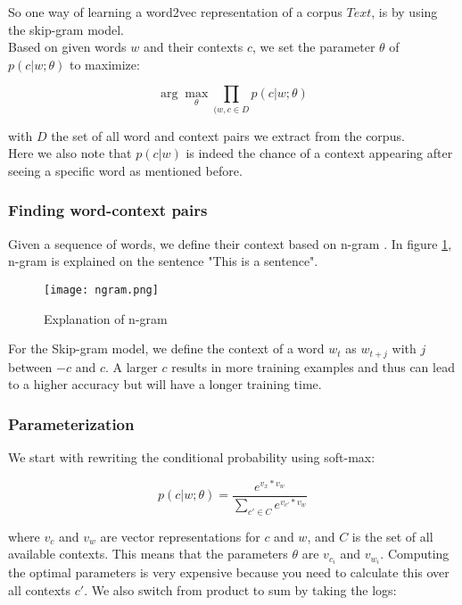 So one way of learning a word2vec representation of a corpus $Text$, is by using the skip-gram model. \\
Based on given words $w$ and their contexts $c$, we set the parameter $\theta$ of $p(c|w;\theta)$ to maximize:

\begin{equation} 
\arg \max_{\theta} \prod_{(w,c \in D} p(c|w;\theta)
\end{equation}

with $D$ the set of all word and context pairs we extract from the corpus.\\
Here we also note that $p(c|w)$ is indeed the chance of a context appearing after seeing a specific word as mentioned before.

\subsubsection{Finding word-context pairs}

Given a sequence of words, we define their context based on n-gram \cite{w2vNgram:article}. In figure \ref{fig:ngram}, n-gram is explained on the sentence "This is a sentence". 

\begin{figure}[H]
	\centering
	\texttt{[image: ngram.png]}
	\caption{Explanation of n-gram \cite{w2vNgram:online}}
	\label{fig:ngram}
\end{figure} 

For the Skip-gram model, we define the context of a word $w_t$ as $w_{t+j}$ with $j$ between $-c$ and $c$. A larger $c$ results in more training examples and thus can lead to a higher accuracy but will have a longer training time.


\subsubsection{Parameterization}

We start with rewriting the conditional probability using soft-max:

\begin{equation} 
p(c|w;\theta) = \frac{e^{v_x*v_w}}{\sum_{c' \in C}e^{v_{c'}*v_w}}
\end{equation}

where $v_c$ and $v_w$ are vector representations for $c$ and $w$, and $C$ is the set of all available contexts. This means that the parameters $\theta$ are $v_{c_i}$ and $v_{w_i}$. Computing the optimal parameters is very expensive because you need to calculate this over all contexts $c'$. We also switch from product to sum by taking the logs:

